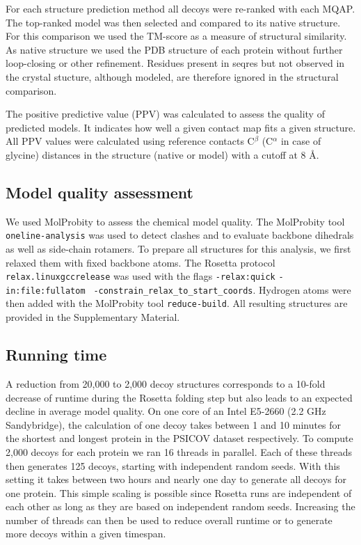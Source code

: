 \documentclass{bioinfo}
\begin{document}
\begin{methods}
For each structure prediction method all decoys were re-ranked with
each MQAP. The top-ranked model was then selected and compared to its
native structure. For this comparison we used the TM-score
\cite[]{zhang_scoring_2004} as a measure of structural similarity. As
native structure we used the PDB structure of each protein without
further loop-closing or other refinement. Residues present in seqres
but not observed in the crystal stucture, although modeled, are therefore ignored in the structural
comparison.

The positive predictive value (PPV) was calculated to assess the
quality of predicted models. It indicates how well a given contact map
fits a given structure. All PPV values were calculated using reference
contacts C$^{\beta}$ (C$^{\alpha}$ in case of glycine) distances in
the structure (native or model) with a cutoff at 8 \AA.


\subsection{Model quality assessment}

We used MolProbity \cite[]{chen_molprobity:_2010} to assess the chemical
model quality. The MolProbity tool {\tt oneline-analysis} was used to 
detect clashes and to evaluate backbone dihedrals as well as 
side-chain rotamers. To prepare all structures for this analysis, we 
first relaxed them with fixed backbone atoms.
The Rosetta protocol {\tt relax.linuxgccrelease} was used with the flags 
{\tt -relax:quick} {\tt -in:file:fullatom} {\tt 
-constrain\_relax\_to\_start\_coords}. Hydrogen atoms were then 
added with the MolProbity tool {\tt reduce-build}. All resulting 
structures are provided in the Supplementary Material.



\subsection{Running time}
A reduction from 20,000 to 2,000 decoy structures corresponds to a 10-fold
decrease of runtime during the Rosetta folding step but also leads to an
expected decline in average model quality. On one core of an Intel
E5-2660 (2.2 GHz Sandybridge), the calculation of one decoy takes
between 1 and 10 minutes for the shortest and longest protein in the
PSICOV dataset respectively. To compute 2,000 decoys for each protein
we ran 16 threads in parallel. Each of these threads then generates
125 decoys, starting with independent random seeds. With this setting
it takes between two hours and nearly one day to generate all decoys
for one protein. This simple scaling is possible since Rosetta runs
are independent of each other as long as they are based on 
independent random seeds. Increasing the number of threads can then be used to reduce
overall runtime or to generate more decoys within a given timespan.

\end{methods}
\end{document}
